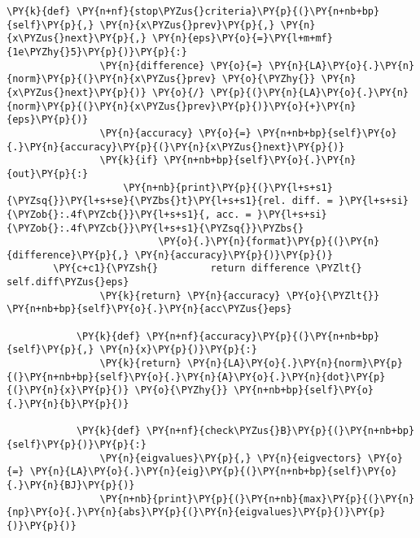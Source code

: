 \begin{Verbatim}[commandchars=\\\{\}]
            \PY{k}{def} \PY{n+nf}{stop\PYZus{}criteria}\PY{p}{(}\PY{n+nb+bp}{self}\PY{p}{,} \PY{n}{x\PYZus{}prev}\PY{p}{,} \PY{n}{x\PYZus{}next}\PY{p}{,} \PY{n}{eps}\PY{o}{=}\PY{l+m+mf}{1e\PYZhy{}5}\PY{p}{)}\PY{p}{:}
                \PY{n}{difference} \PY{o}{=} \PY{n}{LA}\PY{o}{.}\PY{n}{norm}\PY{p}{(}\PY{n}{x\PYZus{}prev} \PY{o}{\PYZhy{}} \PY{n}{x\PYZus{}next}\PY{p}{)} \PY{o}{/} \PY{p}{(}\PY{n}{LA}\PY{o}{.}\PY{n}{norm}\PY{p}{(}\PY{n}{x\PYZus{}prev}\PY{p}{)}\PY{o}{+}\PY{n}{eps}\PY{p}{)}
                \PY{n}{accuracy} \PY{o}{=} \PY{n+nb+bp}{self}\PY{o}{.}\PY{n}{accuracy}\PY{p}{(}\PY{n}{x\PYZus{}next}\PY{p}{)}
                \PY{k}{if} \PY{n+nb+bp}{self}\PY{o}{.}\PY{n}{out}\PY{p}{:}
                    \PY{n+nb}{print}\PY{p}{(}\PY{l+s+s1}{\PYZsq{}}\PY{l+s+se}{\PYZbs{}t}\PY{l+s+s1}{rel. diff. = }\PY{l+s+si}{\PYZob{}:.4f\PYZcb{}}\PY{l+s+s1}{, acc. = }\PY{l+s+si}{\PYZob{}:.4f\PYZcb{}}\PY{l+s+s1}{\PYZsq{}}\PYZbs{}
                          \PY{o}{.}\PY{n}{format}\PY{p}{(}\PY{n}{difference}\PY{p}{,} \PY{n}{accuracy}\PY{p}{)}\PY{p}{)}
        \PY{c+c1}{\PYZsh{}         return difference \PYZlt{} self.diff\PYZus{}eps}
                \PY{k}{return} \PY{n}{accuracy} \PY{o}{\PYZlt{}} \PY{n+nb+bp}{self}\PY{o}{.}\PY{n}{acc\PYZus{}eps}
            
            \PY{k}{def} \PY{n+nf}{accuracy}\PY{p}{(}\PY{n+nb+bp}{self}\PY{p}{,} \PY{n}{x}\PY{p}{)}\PY{p}{:}
                \PY{k}{return} \PY{n}{LA}\PY{o}{.}\PY{n}{norm}\PY{p}{(}\PY{n+nb+bp}{self}\PY{o}{.}\PY{n}{A}\PY{o}{.}\PY{n}{dot}\PY{p}{(}\PY{n}{x}\PY{p}{)} \PY{o}{\PYZhy{}} \PY{n+nb+bp}{self}\PY{o}{.}\PY{n}{b}\PY{p}{)}
            
            \PY{k}{def} \PY{n+nf}{check\PYZus{}B}\PY{p}{(}\PY{n+nb+bp}{self}\PY{p}{)}\PY{p}{:}
                \PY{n}{eigvalues}\PY{p}{,} \PY{n}{eigvectors} \PY{o}{=} \PY{n}{LA}\PY{o}{.}\PY{n}{eig}\PY{p}{(}\PY{n+nb+bp}{self}\PY{o}{.}\PY{n}{BJ}\PY{p}{)}
                \PY{n+nb}{print}\PY{p}{(}\PY{n+nb}{max}\PY{p}{(}\PY{n}{np}\PY{o}{.}\PY{n}{abs}\PY{p}{(}\PY{n}{eigvalues}\PY{p}{)}\PY{p}{)}\PY{p}{)}
            

\end{Verbatim}
